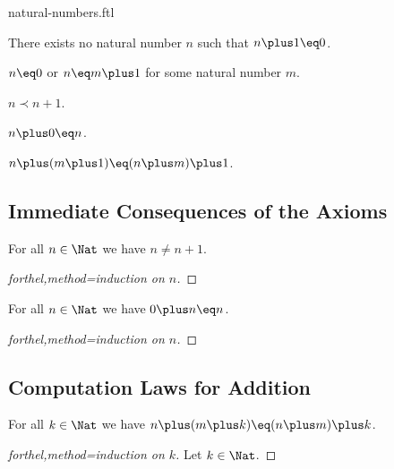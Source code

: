 \documentclass{naproche-library}
\begin{document}
\begin{smodule}{natural-numbers.ftl}
  \begin{axiom}[forthel,title=Peano Axiom II,id=ZeroIsNoSuccessorAx]
    There exists no natural number $n$ such that $n\plus1\eq0$.
  \end{axiom}

  \begin{axiom}[forthel,title=Peano Axiom III,id=NatNumberIsZeroOrSuccessorAx]
    $n\eq0$ or $n\eq m\plus1$ for some natural number $m$.
  \end{axiom}

  \begin{axiom}[forthel,title=Induction Axiom,id=InductionAx]
    $n\prec n\plus1$.
  \end{axiom}

  \begin{axiom}[forthel,title=Addition Axiom I,id=AdditionWithZeroAx]
    $n\plus0\eq n$.
  \end{axiom}

  \begin{axiom}[forthel,title=Addition Axiom II,id=AdditionWithSuccessorAx]
    $n\plus(m\plus1)\eq(n\plus m)\plus1$.
  \end{axiom}


  \subsection{Immediate Consequences of the Axioms}

  \begin{proposition}[forthel,id=NatNumberIsNotItsOwnSuccessorProp]
    For all $n\in\Nat$ we have $n\neq n\plus1$.
  \end{proposition}
  \begin{proof}[forthel,method=induction on $n$]\end{proof}

  \begin{proposition}[forthel,id=ZeroIsLeftIdentityOfPlusProp]
    For all $n\in\Nat$ we have $0\plus n\eq n$.
  \end{proposition}
  \begin{proof}[forthel,method=induction on $n$]\end{proof}


  \subsection{Computation Laws for Addition}

  \begin{proposition}[forthel,title=Associativity,id=PlusIsAssociativeProp]
    For all $k\in\Nat$ we have $n\plus(m\plus k)\eq(n\plus m)\plus k$.
  \end{proposition}
  \begin{proof}[forthel,method=induction on $k$]
    Let $k\in\Nat$.


\end{proof}
\end{smodule}
\end{document}

